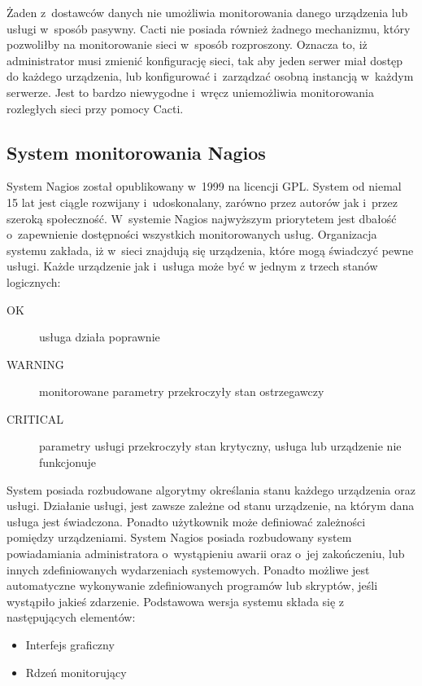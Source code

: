 Żaden z~dostawców danych nie umożliwia monitorowania danego urządzenia
lub usługi w~sposób pasywny. Cacti nie posiada również żadnego
mechanizmu, który pozwoliłby na monitorowanie sieci w~sposób
rozproszony. Oznacza to, iż administrator musi zmienić konfigurację
sieci, tak aby jeden serwer miał dostęp do każdego urządzenia, lub
konfigurować i~zarządzać osobną instancją w~każdym serwerze. Jest to
bardzo niewygodne i~wręcz uniemożliwia monitorowania rozległych sieci
przy pomocy Cacti.

\subsection[Nagios][System monitorowania Nagios]{System monitorowania Nagios}

System Nagios został opublikowany w~1999 na licencji GPL. System od
niemal 15 lat jest ciągle rozwijany i~udoskonalany, zarówno przez
autorów jak i~przez szeroką społeczność. W~systemie Nagios najwyższym
priorytetem jest dbałość o~zapewnienie dostępności wszystkich
monitorowanych usług. Organizacja systemu zakłada, iż w~sieci znajdują
się urządzenia, które mogą świadczyć pewne usługi. Każde urządzenie
jak i~usługa może być w jednym z trzech stanów logicznych:

\begin{description}
\item[OK] usługa działa poprawnie
\item[WARNING] monitorowane parametry przekroczyły stan ostrzegawczy
\item[CRITICAL] parametry usługi przekroczyły stan krytyczny, usługa
  lub urządzenie nie funkcjonuje
\end{description}

System posiada rozbudowane algorytmy określania stanu każdego
urządzenia oraz usługi. Działanie usługi, jest zawsze zależne od stanu
urządzenie, na którym dana usługa jest świadczona. Ponadto użytkownik
może definiować zależności pomiędzy urządzeniami. System Nagios
posiada rozbudowany system powiadamiania administratora o~wystąpieniu
awarii oraz o~jej zakończeniu, lub innych zdefiniowanych wydarzeniach
systemowych. Ponadto możliwe jest automatyczne wykonywanie
zdefiniowanych programów lub skryptów, jeśli wystąpiło jakieś
zdarzenie. Podstawowa wersja systemu składa się z następujących
elementów:

\begin{itemize}
\item Interfejs graficzny
\item Rdzeń monitorujący
\end{itemize}

